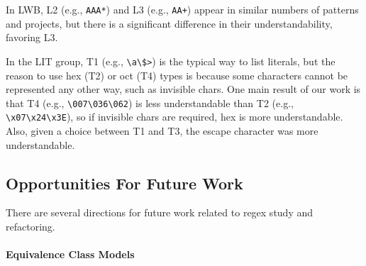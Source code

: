 In  LWB,   L2 (e.g., \verb!AAA*!) and L3 (e.g., \verb!AA+!) appear in similar numbers of patterns and projects, but there is a significant difference in their understandability, favoring L3.


In the LIT group, T1 (e.g., \verb!\a\$>!) is the typical way to list literals, but the reason to use hex (T2) or oct (T4) types is because some characters cannot be represented any other way, such as invisible chars.  One main result of our work is that  T4 (e.g., \verb!\007\036\062!) is  less understandable   than T2 (e.g., \verb!\x07\x24\x3E!), so if invisible chars are required, hex is  more understandable.
Also, given a choice between T1 and T3, the escape character was more understandable.

\subsection{Opportunities For Future Work}
\label{sec:futureequivclasses}
There are several directions for future work related to regex study and refactoring.
%
\paragraph{Equivalence Class Models}

